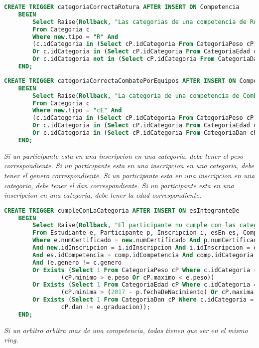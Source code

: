 \begin{lstlisting}[language=SQL]
CREATE TRIGGER categoriaCorrectaRotura AFTER INSERT ON Competencia
    BEGIN
        Select Raise(Rollback, "Las categorias de una competencia de Rotura deben ser: Genero y Graduacion.")
        From Categoria c
        Where new.tipo = "R" And
        (c.idCategoria in (Select cP.idCategoria From CategoriaPeso cP)
        Or c.idCategoria in (Select cP.idCategoria From CategoriaEdad cP)
        Or c.idCategoria not in (Select cP.idCategoria From CategoriaDan cP));
    END;

\end{lstlisting}
\emph{
}

\begin{lstlisting}[language=SQL]
CREATE TRIGGER categoriaCorrectaCombatePorEquipos AFTER INSERT ON Competencia
    BEGIN
        Select Raise(Rollback, "La categoria de una competencia de Combate por Equipos debe ser por Genero.")
        From Categoria c
        Where new.tipo = "cE" And
        (c.idCategoria in (Select cP.idCategoria From CategoriaPeso cP)
        Or c.idCategoria in (Select cP.idCategoria From CategoriaEdad cP)
        Or c.idCategoria in (Select cP.idCategoria From CategoriaDan cP));
    END;

\end{lstlisting}

\emph{
   Si un participante esta en una inscripcion en una categoria, debe tener el peso correspondiente.
   Si un participante esta en una inscripcion en una categoria, debe tener el genero correspondiente.
   Si un participante esta en una inscripcion en una categoria, debe tener el dan correspondiente.
   Si un participante esta en una inscripcion en una categoria, debe tener la edad correspondiente.
}

\begin{lstlisting}[language=SQL]
CREATE TRIGGER cumpleConLaCategoria AFTER INSERT ON esIntegranteDe
    BEGIN
        Select Raise(Rollback, "El participante no cumple con las categorias de la competencia.")
        From Estudiante e, Participante p, Inscripcion i, esEn es, Competencia comp, Categoria c
        Where e.numCertificado = new.numCertificado And p.numCertificado = new.numCertificado 
        And new.idInscripcion = i.idInscripcion And i.idInscripcion = es.idInscripcion 
        And es.idCompetencia = comp.idCompetencia And comp.idCategoria = c.idCategoria
        And (e.genero != c.genero
        Or Exists (Select 1 From CategoriaPeso cP Where c.idCategoria = cP.idCategoria And 
                (cP.minimo > e.peso Or cP.maximo < e.peso))
        Or Exists (Select 1 From CategoriaEdad cP Where c.idCategoria = cP.idCategoria And 
                (cP.minima > (2017 - p.fechaDeNacimiento) Or cP.maxima < (2017 - p.fechaDeNacimiento)))
        Or Exists (Select 1 From CategoriaDan cP Where c.idCategoria = cP.idCategoria And 
                cP.dan != e.graduacion));
    END;

\end{lstlisting}
\emph{
  Si un arbitro arbitra mas de una competencia, todas tienen que ser en el mismo ring.
}

